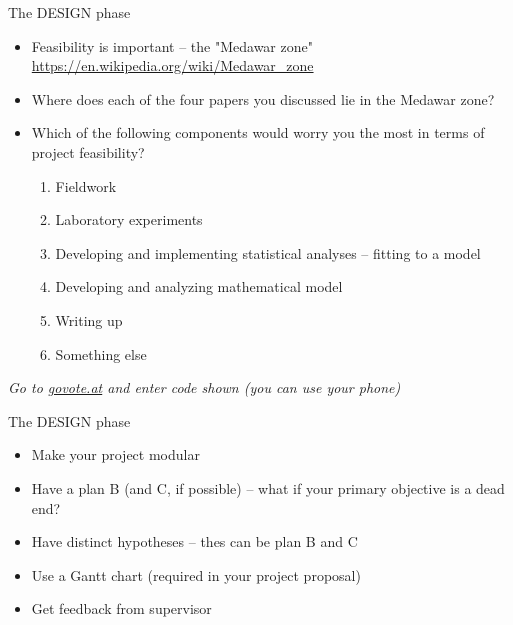 \documentclass[xcolor=x11names,compress]{beamer}
\renewcommand{\(}{\begin{columns}}
\renewcommand{\)}{\end{columns}}
\newcommand{\<}[1]{\begin{column}{#1}}
\renewcommand{\>}{\end{column}}
\begin{document}
\begin{frame}{The DESIGN phase}

  \begin{itemize}[<+->]\itemsep12pt
    \item Feasibility is important -- the "Medawar zone" \\
    \url{https://en.wikipedia.org/wiki/Medawar_zone}
    \item Where does each of the four papers you discussed lie in the Medawar zone?
    \item Which of the following components would worry you the most in terms of project feasibility?
    \begin{enumerate} \setlength{\itemindent}{-1em}\itemsep6pt
        \item Fieldwork
        \item Laboratory experiments
        \item Developing and implementing statistical analyses -- fitting to a model
        \item Developing and analyzing mathematical model
        \item Writing up
        \item Something else
    \end{enumerate}
 \end{itemize}
 
\vspace*{3pt}

\pause
\centering 

{\it Go to \url{govote.at} and enter code shown (you can use your phone)}
\end{frame}

\begin{frame}{The DESIGN phase}

  \begin{itemize}[<+->]\itemsep16pt
    \item Make your project modular
    \item Have a plan B (and C, if possible) -- what if your primary objective is a dead end? 
    \item Have distinct hypotheses -- thes can be plan B and C
    \item Use a Gantt chart (required in your project proposal)
    \item Get feedback from supervisor 
 \end{itemize}
\end{frame}
\end{document}
